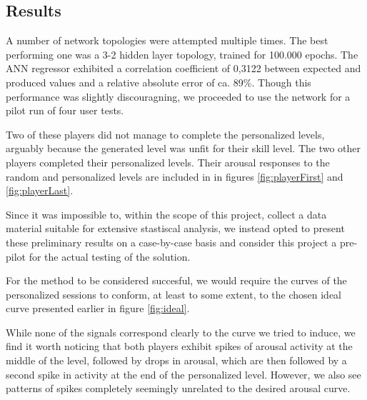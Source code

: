 \documentclass{llncs}
\begin{document}
\subsection{Results}
A number of network topologies were attempted multiple times. The best performing one was a 3-2 hidden layer topology, trained for 100.000 epochs. The ANN regressor exhibited a correlation coefficient of 0,3122 between expected and produced values and a relative absolute error of ca. 89\%. Though this performance was slightly discouragning, we proceeded to use the network for a pilot run of four user tests.

Two of these players did not manage to complete the personalized levels, arguably because the generated level was unfit for their skill level.
The two other players completed their personalized levels. Their arousal responses to the random and personalized levels are included in in figures \ref{fig:playerFirst} and \ref{fig:playerLast}.

Since it was impossible to, within the scope of this project, collect a data material suitable for extensive stastiscal analysis, we instead opted to present these preliminary results on a case-by-case basis and consider this project a pre-pilot for the actual testing of the solution.

For the method to be considered succesful, we would require the curves of the personalized sessions to conform, at least to some extent, to the chosen ideal curve presented earlier in figure \ref{fig:ideal}.

While none of the signals correspond clearly to the curve we tried to induce, we find it worth noticing that both players exhibit spikes of arousal activity at the middle of the level, followed by drops in arousal, which are then followed by a second spike in activity at the end of the personalized level.
However, we also see patterns of spikes completely seemingly unrelated to the desired arousal curve.
\end{document}
